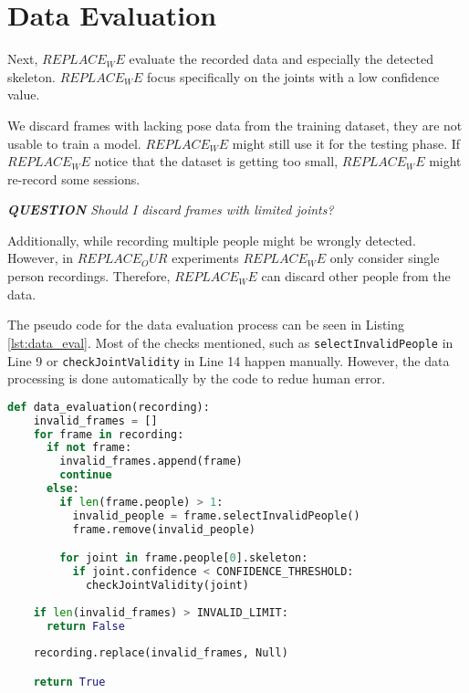 \section{Data Evaluation}
\label{sec:data_evaluation}

Next, $REPLACE_WE$ evaluate the recorded data and especially the detected skeleton. $REPLACE_WE$ focus specifically on the joints with a low confidence value. 

We discard frames with lacking pose data from the training dataset, they are not usable to train a model. $REPLACE_WE$ might still use it for the testing phase. If $REPLACE_WE$ notice that the dataset is getting too small, $REPLACE_WE$ might re-record some sessions.

\textit{\textbf{QUESTION} Should I discard frames with limited joints?}

Additionally, while recording multiple people might be wrongly detected. However, in $REPLACE_OUR$ experiments $REPLACE_WE$ only consider single person recordings. Therefore, $REPLACE_WE$ can discard other people from the data.

The pseudo code for the data evaluation process can be seen in Listing \ref{lst:data_eval}. Most of the checks mentioned, such as \texttt{selectInvalidPeople} in Line 9 or \texttt{checkJointValidity} in Line 14 happen manually. However, the data processing is done automatically by the code to redue human error.

\begin{lstlisting}[language=python,
                    firstnumber=1,
                    caption={[Pseudo code for data evaluation]{Pseudo code for data evaluation}},
                    label={lst:data_eval}]
  def data_evaluation(recording):
    invalid_frames = []
    for frame in recording:
      if not frame:
        invalid_frames.append(frame)
        continue
      else:
        if len(frame.people) > 1:
          invalid_people = frame.selectInvalidPeople()
          frame.remove(invalid_people)

        for joint in frame.people[0].skeleton:
          if joint.confidence < CONFIDENCE_THRESHOLD:
            checkJointValidity(joint)
    
    if len(invalid_frames) > INVALID_LIMIT:
      return False
    
    recording.replace(invalid_frames, Null)

    return True
\end{lstlisting}
